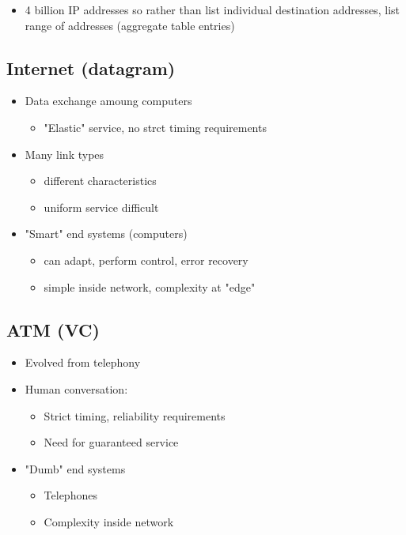 \documentclass[11pt]{article}
\begin{document}
\begin{itemize}
\item 4 billion IP addresses so rather than list individual destination
addresses, list range of addresses (aggregate table entries)
\end{itemize}

\subsection{Internet (datagram)}
\label{sec:orgd2ee5f1}
\begin{itemize}
\item Data exchange amoung computers
\begin{itemize}
\item "Elastic" service, no strct timing requirements
\end{itemize}
\item Many link types 
\begin{itemize}
\item different characteristics
\item uniform service difficult
\end{itemize}
\item "Smart" end systems (computers)
\begin{itemize}
\item can adapt, perform control, error recovery
\item simple inside network, complexity at "edge"
\end{itemize}
\end{itemize}

\subsection{ATM (VC)}
\label{sec:org5e700a3}
\begin{itemize}
\item Evolved from telephony
\item Human conversation:
\begin{itemize}
\item Strict timing, reliability requirements
\item Need for guaranteed service
\end{itemize}
\item "Dumb" end systems
\begin{itemize}
\item Telephones
\item Complexity inside network
\end{itemize}
\end{itemize}
\end{document}
